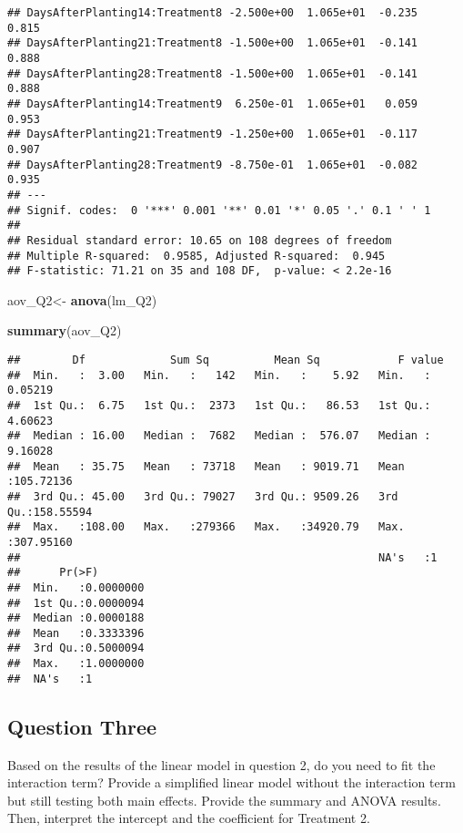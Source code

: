 \documentclass[
  12pt,
]{article}
\newenvironment{Shaded}{\begin{snugshade}}{\end{snugshade}}
\newcommand{\FunctionTok}[1]{\textcolor[rgb]{0.13,0.29,0.53}{\textbf{#1}}}
\newcommand{\NormalTok}[1]{#1}
\newcommand{\OtherTok}[1]{\textcolor[rgb]{0.56,0.35,0.01}{#1}}
\begin{document}
\begin{verbatim}
## DaysAfterPlanting14:Treatment8 -2.500e+00  1.065e+01  -0.235    0.815    
## DaysAfterPlanting21:Treatment8 -1.500e+00  1.065e+01  -0.141    0.888    
## DaysAfterPlanting28:Treatment8 -1.500e+00  1.065e+01  -0.141    0.888    
## DaysAfterPlanting14:Treatment9  6.250e-01  1.065e+01   0.059    0.953    
## DaysAfterPlanting21:Treatment9 -1.250e+00  1.065e+01  -0.117    0.907    
## DaysAfterPlanting28:Treatment9 -8.750e-01  1.065e+01  -0.082    0.935    
## ---
## Signif. codes:  0 '***' 0.001 '**' 0.01 '*' 0.05 '.' 0.1 ' ' 1
## 
## Residual standard error: 10.65 on 108 degrees of freedom
## Multiple R-squared:  0.9585, Adjusted R-squared:  0.945 
## F-statistic: 71.21 on 35 and 108 DF,  p-value: < 2.2e-16
\end{verbatim}

\begin{Shaded}
\begin{Highlighting}[]
\NormalTok{aov\_Q2}\OtherTok{\textless{}{-}} \FunctionTok{anova}\NormalTok{(lm\_Q2)}

\FunctionTok{summary}\NormalTok{(aov\_Q2)}
\end{Highlighting}
\end{Shaded}

\begin{verbatim}
##        Df             Sum Sq          Mean Sq            F value         
##  Min.   :  3.00   Min.   :   142   Min.   :    5.92   Min.   :  0.05219  
##  1st Qu.:  6.75   1st Qu.:  2373   1st Qu.:   86.53   1st Qu.:  4.60623  
##  Median : 16.00   Median :  7682   Median :  576.07   Median :  9.16028  
##  Mean   : 35.75   Mean   : 73718   Mean   : 9019.71   Mean   :105.72136  
##  3rd Qu.: 45.00   3rd Qu.: 79027   3rd Qu.: 9509.26   3rd Qu.:158.55594  
##  Max.   :108.00   Max.   :279366   Max.   :34920.79   Max.   :307.95160  
##                                                       NA's   :1          
##      Pr(>F)         
##  Min.   :0.0000000  
##  1st Qu.:0.0000094  
##  Median :0.0000188  
##  Mean   :0.3333396  
##  3rd Qu.:0.5000094  
##  Max.   :1.0000000  
##  NA's   :1
\end{verbatim}

\subsection{Question Three}\label{question-three}

Based on the results of the linear model in question 2, do you need to
fit the interaction term? Provide a simplified linear model without the
interaction term but still testing both main effects. Provide the
summary and ANOVA results. Then, interpret the intercept and the
coefficient for Treatment 2.
\end{document}
